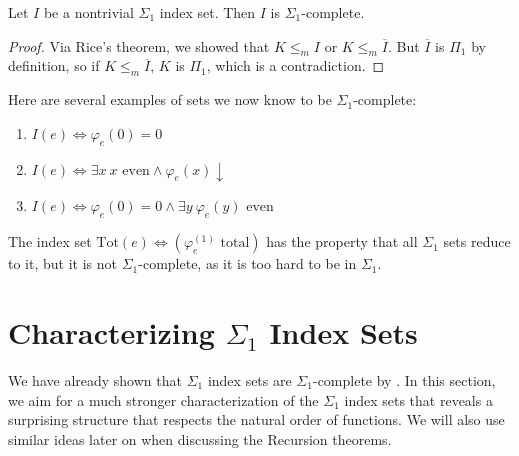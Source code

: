\begin{proposition}\label{index-set-complete}
Let $I$ be a nontrivial $\Sigma_1$ index set. Then $I$ is $\Sigma_1$-complete.
\end{proposition}
\begin{proof}
Via Rice's theorem, we showed that $K \leq_m I$ or $K \leq_m \overline{I}$. But $\overline{I}$ is $\Pi_1$ by definition, so if $K \leq_m \overline{I}$, $K$ is $\Pi_1$, which is a contradiction.
\end{proof}

Here are several examples of sets we now know to be $\Sigma_1$-complete:
\begin{enumerate}
    \item $I(e) \iff \varphi_e(0) = 0$
    \item $I(e) \iff \exists x \ x \text{ even} \land \varphi_e(x) \downarrow$
    \item $I(e) \iff \varphi_e(0) = 0 \land \exists y \ \varphi_e(y) \text{ even}$
\end{enumerate}

The index set $\text{Tot}(e) \iff \left(\varphi_e^{(1)} \text{ total}\right)$ has the property that all $\Sigma_1$ sets reduce to it, but it is not $\Sigma_1$-complete, as it is too hard to be in $\Sigma_1$. 

\section{Characterizing $\Sigma_1$ Index Sets}
We have already shown that $\Sigma_1$ index sets are $\Sigma_1$-complete by . In this section, we aim for a much stronger characterization of the $\Sigma_1$ index sets that reveals a surprising structure that respects the natural order of functions. We will also use similar ideas later on when discussing the Recursion theorems.


